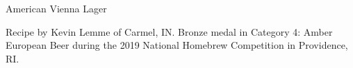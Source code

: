 \stylesection{\styleviennalager}

\begin{recipe}{American Vienna Lager} %

\begin{aboutblock}
Recipe by Kevin Lemme of Carmel, IN. Bronze medal in Category 4: Amber European
Beer during the 2019 National Homebrew Competition in Providence, RI. \sourceaha
\end{aboutblock}


\begin{methodandtiming}
 
\begin{mashsteps}
\end{mashsteps}

\begin{fermentationsteps}
\end{fermentationsteps}

\end{methodandtiming}

\recipebreak

\begin{ingredientsblock}

\begin{malts}
\end{malts}

\begin{hops}
\end{hops}


\end{ingredientsblock}

\end{recipe}


